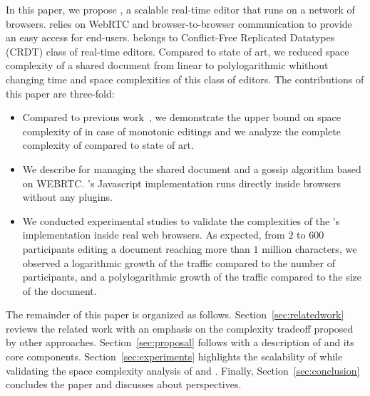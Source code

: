 In this paper, we propose \CRATE, a scalable real-time editor that runs on a
network of browsers. \CRATE relies on WebRTC and browser-to-browser
communication to provide an easy access for end-users. \CRATE belongs to
Conflict-Free Replicated Datatypes (CRDT) class of real-time editors. Compared
to state of art, we reduced space complexity of a shared document from linear to
polylogarithmic whithout changing time and space complexities of this class of
editors.  The contributions of this paper are three-fold:
\begin{itemize}
\item Compared to previous work~\cite{nedelec2013lseq}, we demonstrate
  the upper bound on space complexity of \LSEQ in case of monotonic
  editings and we analyze the complete complexity of \CRATE compared
  to state of art.
\item We describe \LSEQ for managing the shared document
  and \SPRAY a gossip algorithm based on WEBRTC. \CRATE's Javascript
  implementation runs directly inside browsers without any plugins.
\item We conducted experimental studies to validate the complexities of the
  \CRATE's implementation inside real web browsers. As expected, from $2$ to $600$
  participants editing a document reaching more than $1$ million characters, we
  observed a logarithmic growth of the traffic compared to the number of
  participants, and a polylogarithmic growth of the traffic compared to the size
  of the document.
\end{itemize}

The remainder of this paper is organized as
follows. Section~\ref{sec:relatedwork} reviews the related work with an emphasis
on the complexity tradeoff proposed by other
approaches. Section~\ref{sec:proposal} follows with a description of \CRATE and
its core components. Section~\ref{sec:experiments} highlights the scalability of
\CRATE while validating the space complexity analysis of \LSEQ and
\SPRAY. Finally, Section~\ref{sec:conclusion} concludes the paper and discusses
about perspectives.

